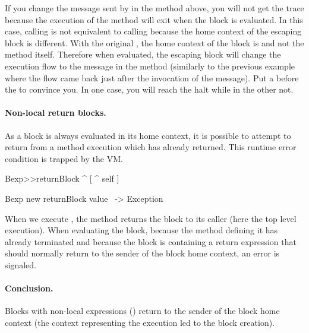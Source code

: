 \documentclass[a4paper,10pt,twoside]{book}
\begin{document}
If you change the  message sent by  in the  method above, you will not get the trace because the execution of the method  will exit when the block is evaluated. In this case, calling  is not equivalent to calling  because the home context of the escaping block \ct{[ ^ nil ]} is different.  With the original , the home context of the block \ct{[^ nil]}
is  and not the method  itself.
Therefore when evaluated, the escaping block will change the execution flow to the  message in the method  (similarly to the previous example where the flow came back just after the invocation of the  message). Put a  before the  to convince you. In one case, you will reach the halt while in the other not.

\paragraph{Non-local return blocks.} As a block is always evaluated in its home context, it is possible to attempt to return from a method execution which has already returned. This runtime error condition is trapped by the VM.

\begin{code}{}
Bexp>>returnBlock
	^ [ ^ self ]

Bexp new returnBlock value ~-> Exception
\end{code}

When we execute , the method returns the block to its caller (here the top level execution). When evaluating the block, because the method defining it has already terminated and because the block is containing a return expression that should normally   return to the sender of the block home context, an error is signaled.


\paragraph{Conclusion.} Blocks with non-local expressions (\ct{[^ ...]})
return to the sender of the block home context (the context representing the execution led to the block creation).



\end{document}
